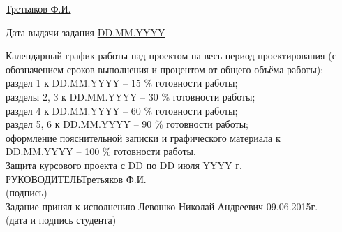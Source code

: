 \underline{Третьяков Ф.И.} 
\item Дата выдачи задания \underline{DD.MM.YYYY}
\item Календарный график работы над проектом на весь период проектирования (с обозначением сроков выполнения и процентом от общего объёма работы):\\
\underline{\hspace*{16cm}}\hspace*{-16cm}раздел 1 к DD.MM.YYYY – 15 \% готовности работы;\\ 
\underline{\hspace*{16cm}}\hspace*{-16cm}разделы 2, 3 к DD.MM.YYYY – 30 \% готовности работы;\\ 
\underline{\hspace*{16cm}}\hspace*{-16cm}раздел 4 к DD.MM.YYYY – 60 \% готовности работы;\\
\underline{\hspace*{16cm}}\hspace*{-16cm}раздел 5, 6 к DD.MM.YYYY – 90 \% готовности работы;\\
\underline{\hspace*{16cm}}\hspace*{-16cm}оформление пояснительной записки и графического материала к\\
\underline{\hspace*{16cm}}\hspace*{-16cm}DD.MM.YYYY – 100 \% готовности работы.\\
\underline{\hspace*{16cm}}\hspace*{-16cm}Защита курсового проекта с DD по DD июля YYYY г.\\

\hspace*{7cm}РУКОВОДИТЕЛЬ\underline{\hspace*{4cm}}\hspace*{-3.9cm}Третьяков Ф.И.\\
\hspace*{11.5cm}\small (подпись) \normalsize\\
\bigskip
Задание принял к исполнению \underline{\hspace*{10.5cm}}\hspace*{-8cm}Левошко Николай Андреевич 09.06.2015г.\\
\hspace*{7cm}\small (дата и подпись студента) \normalsize\\